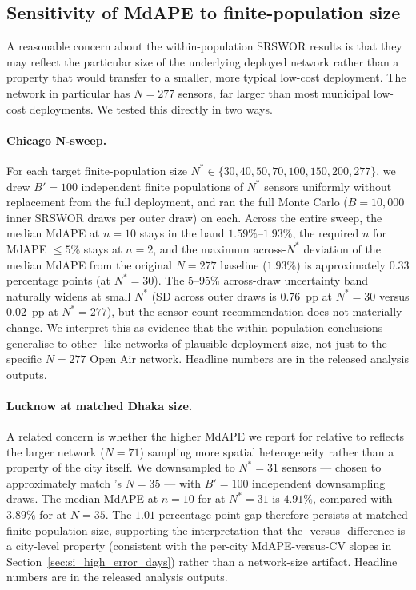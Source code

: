 \subsection{Sensitivity of MdAPE to finite-population size}\label{sec:si_finite_population_sensitivity}

A reasonable concern about the within-population SRSWOR results is that they may reflect the particular size of the underlying deployed network rather than a property that would transfer to a smaller, more typical low-cost deployment. The  network in particular has $N=277$ sensors, far larger than most municipal low-cost deployments. We tested this directly in two ways.

\paragraph{Chicago N-sweep.} For each target finite-population size $N^* \in \{30, 40, 50, 70, 100, 150, 200, 277\}$, we drew $B'=100$ independent finite populations of $N^*$ sensors uniformly without replacement from the full  deployment, and ran the full Monte Carlo ($B=10{,}000$ inner SRSWOR draws per outer draw) on each. Across the entire sweep, the median MdAPE at $n=10$ stays in the band $1.59\%$--$1.93\%$, the required $n$ for MdAPE $\le 5\%$ stays at $n=2$, and the maximum across-$N^*$ deviation of the median MdAPE from the original $N=277$ baseline ($1.93\%$) is approximately $0.33$ percentage points (at $N^*=30$). The $5$--$95\%$ across-draw uncertainty band naturally widens at small $N^*$ (SD across outer draws is $0.76$~pp at $N^*=30$ versus $0.02$~pp at $N^*=277$), but the sensor-count recommendation does not materially change. We interpret this as evidence that the  within-population conclusions generalise to other -like networks of plausible deployment size, not just to the specific $N=277$ Open Air network. Headline numbers are in the released analysis outputs.

\paragraph{Lucknow at matched Dhaka size.} A related concern is whether the higher MdAPE we report for  relative to  reflects the larger  network ($N=71$) sampling more spatial heterogeneity rather than a property of the city itself. We downsampled  to $N^*=31$ sensors --- chosen to approximately match 's $N=35$ --- with $B'=100$ independent downsampling draws. The median MdAPE at $n=10$ for  at $N^*=31$ is $4.91\%$, compared with $3.89\%$ for  at $N=35$. The $1.01$ percentage-point gap therefore persists at matched finite-population size, supporting the interpretation that the -versus- difference is a city-level property (consistent with the per-city MdAPE-versus-CV slopes in Section~\ref{sec:si_high_error_days}) rather than a network-size artifact. Headline numbers are in the released analysis outputs.

